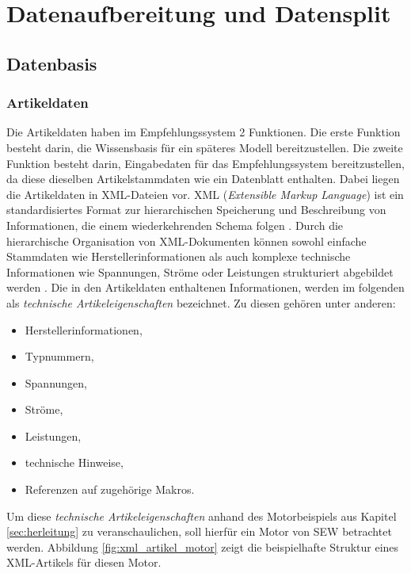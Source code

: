 \chapter{Datenaufbereitung und Datensplit} 
\label{chap:datenaufbereitung_und_datensplit} 

\section{Datenbasis} 

\subsection{Artikeldaten}
\label{sec:artikeldaten} 

Die Artikeldaten haben im Empfehlungssystem 2 Funktionen. Die erste Funktion besteht darin, die Wissensbasis für ein späteres Modell bereitzustellen. 
Die zweite Funktion besteht darin, Eingabedaten für das Empfehlungssystem bereitzustellen, da diese dieselben Artikelstammdaten wie ein Datenblatt enthalten.
Dabei liegen die Artikeldaten in XML-Dateien vor. 
XML (\textit{Extensible Markup Language}) ist ein standardisiertes Format zur hierarchischen Speicherung und Beschreibung von Informationen, die einem wiederkehrenden Schema folgen \cite{bray2008xml}.
Durch die hierarchische Organisation von XML-Dokumenten können sowohl einfache Stammdaten wie Herstellerinformationen als auch komplexe technische Informationen wie Spannungen, 
Ströme oder Leistungen strukturiert abgebildet werden \cite{bray2008xml}.
Die in den Artikeldaten enthaltenen Informationen, werden im folgenden als \textit{technische Artikeleigenschaften} bezeichnet. 
Zu diesen gehören unter anderen:

\begin{itemize} 
    \item Herstellerinformationen, 
    \item Typnummern, 
    \item Spannungen, 
    \item Ströme, 
    \item Leistungen,  
    \item technische Hinweise, 
    \item Referenzen auf zugehörige Makros. 
\end{itemize} 

Um diese \textit{technische Artikeleigenschaften} anhand des Motorbeispiels aus Kapitel \ref{sec:herleitung} zu veranschaulichen, soll hierfür ein Motor von SEW betrachtet werden.
Abbildung \ref{fig:xml_artikel_motor} zeigt die beispielhafte Struktur eines XML-Artikels für diesen Motor.

